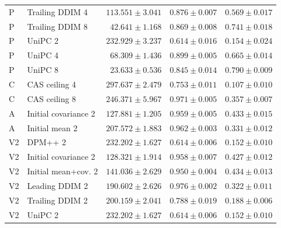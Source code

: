 \begin{table}[t]
\begin{tabular}{llrrr}
P & Trailing DDIM 4 & $113.551\pm3.041$ & $0.876\pm0.007$ & $0.569\pm0.017$ \\
P & Trailing DDIM 8 & $42.641\pm1.168$ & $0.869\pm0.008$ & $0.741\pm0.018$ \\
P & UniPC 2 & $232.929\pm3.237$ & $0.614\pm0.016$ & $0.154\pm0.024$ \\
P & UniPC 4 & $68.309\pm1.436$ & $0.899\pm0.005$ & $0.665\pm0.014$ \\
P & UniPC 8 & $23.633\pm0.536$ & $0.845\pm0.014$ & $0.790\pm0.009$ \\
C & CAS ceiling 4 & $297.637\pm2.479$ & $0.753\pm0.011$ & $0.107\pm0.010$ \\
C & CAS ceiling 8 & $246.371\pm5.967$ & $0.971\pm0.005$ & $0.357\pm0.007$ \\
A & Initial covariance 2 & $127.881\pm1.205$ & $0.959\pm0.005$ & $0.433\pm0.015$ \\
A & Initial mean 2 & $207.572\pm1.883$ & $0.962\pm0.003$ & $0.331\pm0.012$ \\
V2 & DPM++ 2 & $232.202\pm1.627$ & $0.614\pm0.006$ & $0.152\pm0.010$ \\
V2 & Initial covariance 2 & $128.321\pm1.914$ & $0.958\pm0.007$ & $0.427\pm0.012$ \\
V2 & Initial mean+cov. 2 & $141.036\pm2.629$ & $0.950\pm0.004$ & $0.434\pm0.013$ \\
V2 & Leading DDIM 2 & $190.602\pm2.626$ & $0.976\pm0.002$ & $0.322\pm0.011$ \\
V2 & Trailing DDIM 2 & $200.159\pm2.041$ & $0.788\pm0.019$ & $0.188\pm0.006$ \\
V2 & UniPC 2 & $232.202\pm1.627$ & $0.614\pm0.006$ & $0.152\pm0.010$ \\
\bottomrule
\end{tabular}
\end{table}
